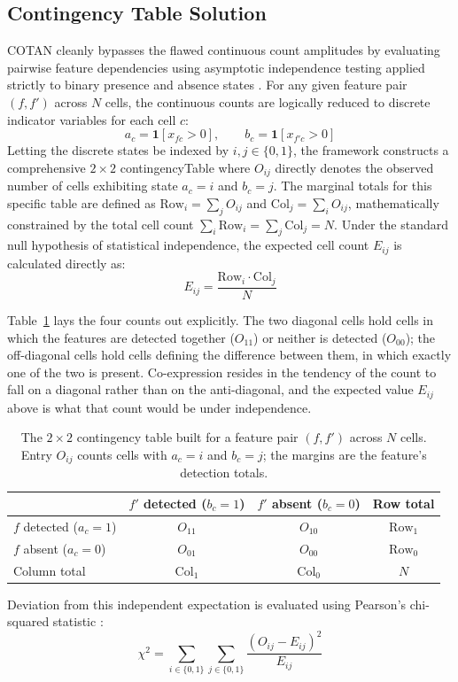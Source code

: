 \subsection{Contingency Table Solution}

COTAN cleanly bypasses the flawed continuous count amplitudes by evaluating pairwise feature dependencies using asymptotic independence testing applied strictly to binary presence and absence states \cite{galfre2021cotan}. For any given feature pair $(f, f')$ across $N$ cells, the continuous counts are logically reduced to discrete indicator variables for each cell $c$:
$$ a_c = \mathbf{1}[x_{fc} > 0], \qquad b_c = \mathbf{1}[x_{f'c} > 0] $$
Letting the discrete states be indexed by $i, j \in \{0,1\}$, the framework constructs a comprehensive $2 \times 2$ \gls{contingencyTable} where $O_{ij}$ directly denotes the observed number of cells exhibiting state $a_c = i$ and $b_c = j$. The marginal totals for this specific table are defined as $\mathrm{Row}_i = \sum_j O_{ij}$ and $\mathrm{Col}_j = \sum_i O_{ij}$, mathematically constrained by the total cell count $\sum_i \mathrm{Row}_i = \sum_j \mathrm{Col}_j = N$. Under the standard null hypothesis of statistical independence, the expected cell count $E_{ij}$ is calculated directly as:
$$ E_{ij} = \frac{\mathrm{Row}_i \cdot \mathrm{Col}_j}{N} $$

Table~\ref{tab:contingency} lays the four counts out explicitly. The two diagonal cells hold cells in which the features are detected together ($O_{11}$) or neither is detected ($O_{00}$); the off-diagonal cells hold cells defining the difference between them, in which exactly one of the two is present. Co-expression resides in the tendency of the count to fall on a diagonal rather than on the anti-diagonal, and the expected value $E_{ij}$ above is what that count would be under independence.

\begin{table}[htbp]
\centering
\small
\setlength{\tabcolsep}{7pt}
\caption{The $2 \times 2$ contingency table built for a feature pair $(f, f')$ across $N$ cells. Entry $O_{ij}$ counts cells with $a_c = i$ and $b_c = j$; the margins are the feature's detection totals.}\label{tab:contingency}
\begin{tabular}{lccc}
\toprule
 & \textbf{$f'$ detected ($b_c = 1$)} & \textbf{$f'$ absent ($b_c = 0$)} & \textbf{Row total} \\
\midrule
$f$ detected ($a_c = 1$) & $O_{11}$ & $O_{10}$ & $\mathrm{Row}_1$ \\
$f$ absent ($a_c = 0$) & $O_{01}$ & $O_{00}$ & $\mathrm{Row}_0$ \\
\midrule
Column total & $\mathrm{Col}_1$ & $\mathrm{Col}_0$ & $N$ \\
\bottomrule
\end{tabular}
\end{table}
Deviation from this independent expectation is evaluated using Pearson's chi-squared statistic \cite{galfre2021cotan}:
$$ \chi^2 = \sum_{i \in \{0,1\}} \sum_{j \in \{0,1\}} \frac{(O_{ij} - E_{ij})^2}{E_{ij}} $$

